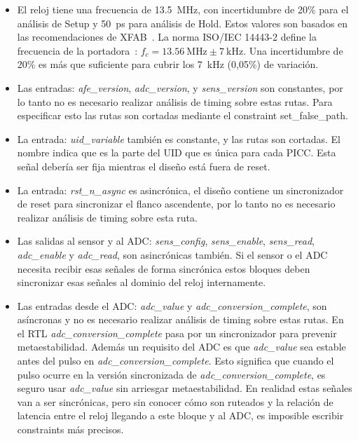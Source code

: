 \documentclass[a4paper, twoside, 11pt]{report}
\begin{document}
\begin{itemize}
  \item El reloj tiene una frecuencia de \SI{13.5}{\mega\hertz}, con incertidumbre de 20\% para el análisis de Setup y \SI{50}{\pico\second} para análisis de Hold. Estos valores son basados en las recomendaciones de XFAB~\cite{dig_imp_guidelines}. La norma ISO/IEC 14443-2 define la frecuencia de la portadora~\cite{iso14443-2}: $f_c = \SI{13.56}{\mega\hertz} \pm \SI{7}{\kilo\hertz}$. Una incertidumbre de 20\% es más que suficiente para cubrir los \SI{7}{\kilo\hertz} (0,05\%) de variación.
  \item Las entradas: \textit{afe\_version}, \textit{adc\_version}, y \textit{sens\_version} son constantes, por lo tanto no es necesario realizar análisis de timing sobre estas rutas. Para especificar esto las rutas son cortadas mediante el constraint set\_false\_path.
  \item La entrada: \textit{uid\_variable} también es constante, y las rutas son cortadas. El nombre indica que es la parte del UID que es única para cada PICC. Esta señal debería ser fija mientras el diseño está fuera de reset.
  \item La entrada: \textit{rst\_n\_async} es asincrónica, el diseño contiene un sincronizador de reset para sincronizar el flanco ascendente, por lo tanto no es necesario realizar análisis de timing sobre esta ruta.
  \item Las salidas al sensor y al ADC: \textit{sens\_config}, \textit{sens\_enable}, \textit{sens\_read}, \textit{adc\_enable} y \textit{adc\_read}, son asincrónicas también. Si el sensor o el ADC necesita recibir esas señales de forma sincrónica estos bloques deben sincronizar esas señales al dominio del reloj internamente.
  \item Las entradas desde el ADC: \textit{adc\_value} y \textit{adc\_conversion\_complete}, son asíncronas y no es necesario realizar análisis de timing sobre estas rutas. En el RTL \textit{adc\_conversion\_complete} pasa por un sincronizador para prevenir metaestabilidad. Además un requisito del ADC es que \textit{adc\_value} sea estable antes del pulso en \textit{adc\_conversion\_complete}. Esto significa que cuando el pulso ocurre en la versión sincronizada de \textit{adc\_conversion\_complete}, es seguro usar \textit{adc\_value} sin arriesgar metaestabilidad. En realidad estas señales van a ser sincrónicas, pero sin conocer cómo son ruteados y la relación de latencia entre el reloj llegando a este bloque y al ADC, es imposible escribir constraints más precisos.

\end{itemize}
\end{document}
